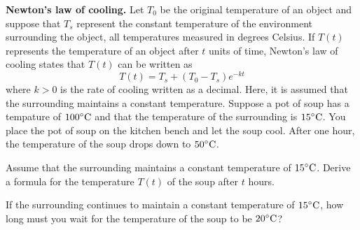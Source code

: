 \documentclass[a4paper,oneside,12pt]{article}
\begin{document}

\begin{exercise}
\textbf{Newton's law of cooling.}
Let $T_0$ be the original temperature of an object and suppose that
$T_s$ represent the constant temperature of the environment
surrounding the object, all temperatures measured in degrees Celsius.
If $T(t)$ represents the temperature of an object after $t$ units of
time, Newton's law of cooling states that $T(t)$ can be written as
\begin{equation}
\label{eqn:logarithm:Newton_law_cooling}
T(t)
=
T_s + (T_0 - T_s) e^{-kt}
\end{equation}
where $k > 0$ is the rate of cooling written as a decimal.  Here, it
is assumed that the surrounding maintains a constant temperature.
Suppose a pot of soup has a tempature of ${100}^{\circ}\textrm{C}$ and that the
temperature of the surrounding is ${15}^{\circ}\textrm{C}$.  You place the pot
of soup on the kitchen bench and let the soup cool.  After one hour, the
temperature of the soup drops down to ${50}^{\circ}\textrm{C}$.
\begin{packedenum}
\item\label{subex:logarithm:Newton_law_cooling_soup_formula}
  Assume that the surrounding maintains a constant temperature of
  ${15}^{\circ}\textrm{C}$.  Derive a formula for the temperature $T(t)$ of the
  soup after $t$ hours.

\item\label{subex:logarithm:Newton_law_cooling_soup_20}
  If the surrounding continues to maintain a constant temperature of
  ${15}^{\circ}\textrm{C}$, how long must you wait for the temperature of the
  soup to be ${20}^{\circ}\textrm{C}$?
\end{packedenum}
\end{exercise}
\end{document}
